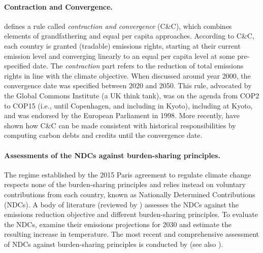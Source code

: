 \paragraph{Contraction and Convergence.} \citet{meyer_briefing_2004} defines a rule called \textit{contraction and convergence} (C\&C), which combines elements of grandfathering and equal per capita approaches. According to C\&C, each country is granted (tradable) emissions rights, starting at their current emission level and converging linearly to an equal per capita level at some pre-specified date. The \textit{contraction} part refers to the reduction of total emissions rights in line with the climate objective. When discussed around year 2000, the convergence date was specified between 2020 and 2050. This rule, advocated by the Global Commons Institute (a UK think tank), was on the agenda from COP2 to COP15 (i.e., until Copenhagen, and including in Kyoto), including at Kyoto, and was endorsed by the European Parliament in 1998. More recently, \citet{gignac_allocating_2015} have shown how C\&C can be made consistent with historical responsibilities by computing carbon debts and credits until the convergence date.

\paragraph{Assessments of the NDCs against burden-sharing principles.} 
The regime established by the 2015 Paris agreement to regulate climate change respects none of the burden-sharing principles and relies instead on voluntary contributions from each country, known as Nationally Determined Contributions (NDCs). A body of literature (reviewed by \citealp{hohne_regional_2014}) assesses the NDCs against the emissions reduction objective and different burden-sharing principles. To evaluate the NDCs, \citet{gao_sufficient_2019} examine their emissions projections for 2030 and estimate the resulting increase in temperature. The most recent and comprehensive assessment of NDCs against burden-sharing principles is conducted by \citet{van_den_berg_implications_2020} (see also \citealp{robiou_du_pont_national_2016,robiou_du_pont_equitable_2017,raupach_sharing_2014}). 

